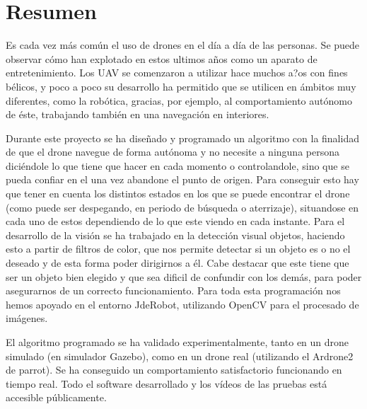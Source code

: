 \chapter*{Resumen}
\hspace{1cm} Es cada vez m\'as com\'un el uso de drones en el d\'ia a d\'ia de las personas. Se puede observar c\'omo han explotado en estos ultimos años como un aparato de entretenimiento. Los UAV se comenzaron a utilizar hace muchos a?os con fines b\'elicos, y poco a poco su desarrollo ha permitido que se utilicen en \'ambitos muy diferentes, como la rob\'otica, gracias, por ejemplo, al comportamiento aut\'onomo de \'este, trabajando tambi\'en en una navegaci\'on en interiores. 

\hspace{1cm} Durante este proyecto se ha diseñado y programado un algoritmo con la finalidad de que el drone navegue de forma aut\'onoma y no necesite a ninguna persona dici\'endole lo que tiene que hacer en cada momento o controlandole, sino que se pueda confiar en el una vez abandone el punto de origen. Para conseguir esto hay que tener en cuenta los distintos estados en los que se puede encontrar el drone (como puede ser despegando, en periodo de b\'usqueda o aterrizaje), situandose en cada uno de estos dependiendo de lo que este viendo en cada instante. Para el desarrollo de la visi\'on se ha trabajado en la detecci\'on visual objetos, haciendo esto a partir de filtros de color, que nos permite detectar si un objeto es o no el deseado y de esta forma poder dirigirnos a \'el. Cabe destacar que este tiene que ser un objeto bien elegido y que sea dificil de confundir con los dem\'as, para poder asegurarnos de un correcto funcionamiento. Para toda esta programaci\'on nos hemos apoyado en el entorno JdeRobot, utilizando OpenCV para el procesado de im\'agenes.

\hspace{1cm} El algoritmo programado se ha validado experimentalmente, tanto en un drone simulado (en simulador Gazebo), como en un drone real (utilizando el Ardrone2 de parrot). Se ha conseguido un comportamiento satisfactorio funcionando en tiempo real. Todo el software desarrollado y los v\'ideos de las pruebas est\'a accesible p\'ublicamente. 


 

